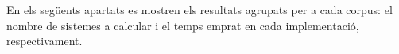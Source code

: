 \documentclass[11pt,a4paper]{article}
\begin{document}
En els següents apartats es mostren els resultats agrupats per a cada corpus: el nombre de sistemes a calcular i el temps emprat en cada implementació, respectivament.

\end{document}
